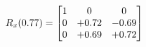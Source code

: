 \documentclass[preview]{standalone}
\begin{document}
\begin{align*}
\special{dvisvgm:raw <g id='unique000'>}R_{x}(0.77) = \begin{bmatrix}1 & 0 & 0 \\0 & +0.72 & -0.69 \\0 & +0.69 & +0.72\end{bmatrix}\special{dvisvgm:raw </g>}
\end{align*}
\end{document}
